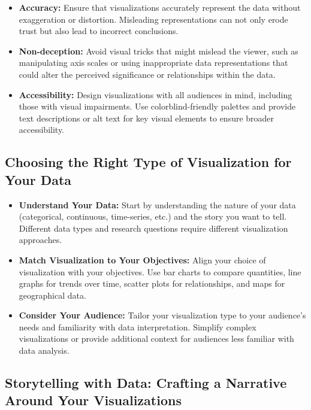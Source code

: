 \documentclass[
]{book}
\begin{document}
\begin{itemize}
\item
  \textbf{Accuracy:} Ensure that visualizations accurately represent the data without exaggeration or distortion. Misleading representations can not only erode trust but also lead to incorrect conclusions.
\item
  \textbf{Non-deception:} Avoid visual tricks that might mislead the viewer, such as manipulating axis scales or using inappropriate data representations that could alter the perceived significance or relationships within the data.
\item
  \textbf{Accessibility:} Design visualizations with all audiences in mind, including those with visual impairments. Use colorblind-friendly palettes and provide text descriptions or alt text for key visual elements to ensure broader accessibility.
\end{itemize}

\subsection{Choosing the Right Type of Visualization for Your Data}\label{choosing-the-right-type-of-visualization-for-your-data}

\begin{itemize}
\item
  \textbf{Understand Your Data:} Start by understanding the nature of your data (categorical, continuous, time-series, etc.) and the story you want to tell. Different data types and research questions require different visualization approaches.
\item
  \textbf{Match Visualization to Your Objectives:} Align your choice of visualization with your objectives. Use bar charts to compare quantities, line graphs for trends over time, scatter plots for relationships, and maps for geographical data.
\item
  \textbf{Consider Your Audience:} Tailor your visualization type to your audience's needs and familiarity with data interpretation. Simplify complex visualizations or provide additional context for audiences less familiar with data analysis.
\end{itemize}

\subsection{Storytelling with Data: Crafting a Narrative Around Your Visualizations}\label{storytelling-with-data-crafting-a-narrative-around-your-visualizations}
\end{document}
